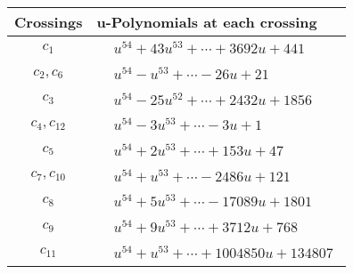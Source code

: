 \documentclass[1p]{elsarticle_modified}
\theoremstyle{definition}
\begin{document}
\begin{tabular}{m{50pt}|m{274pt}}
Crossings & \hspace{64pt}u-Polynomials at each crossing \\
\hline $$\begin{aligned}c_{1}\end{aligned}$$&$\begin{aligned}
&u^{54}+43 u^{53}+\cdots+3692 u+441
\end{aligned}$\\
\hline $$\begin{aligned}c_{2},c_{6}\end{aligned}$$&$\begin{aligned}
&u^{54}- u^{53}+\cdots-26 u+21
\end{aligned}$\\
\hline $$\begin{aligned}c_{3}\end{aligned}$$&$\begin{aligned}
&u^{54}-25 u^{52}+\cdots+2432 u+1856
\end{aligned}$\\
\hline $$\begin{aligned}c_{4},c_{12}\end{aligned}$$&$\begin{aligned}
&u^{54}-3 u^{53}+\cdots-3 u+1
\end{aligned}$\\
\hline $$\begin{aligned}c_{5}\end{aligned}$$&$\begin{aligned}
&u^{54}+2 u^{53}+\cdots+153 u+47
\end{aligned}$\\
\hline $$\begin{aligned}c_{7},c_{10}\end{aligned}$$&$\begin{aligned}
&u^{54}+u^{53}+\cdots-2486 u+121
\end{aligned}$\\
\hline $$\begin{aligned}c_{8}\end{aligned}$$&$\begin{aligned}
&u^{54}+5 u^{53}+\cdots-17089 u+1801
\end{aligned}$\\
\hline $$\begin{aligned}c_{9}\end{aligned}$$&$\begin{aligned}
&u^{54}+9 u^{53}+\cdots+3712 u+768
\end{aligned}$\\
\hline $$\begin{aligned}c_{11}\end{aligned}$$&$\begin{aligned}
&u^{54}+u^{53}+\cdots+1004850 u+134807
\end{aligned}$\\
\hline
\end{tabular}\\~\\
\end{document}
